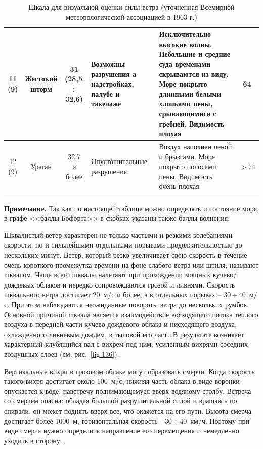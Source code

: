 \documentclass[a4paper, 12pt, twoside, final, book, russian, fittopage, cyremdash]{ncc}
\newcommand{\otdo}{\,\ensuremath{\div}\,}
\newcommand{\ris}[1]{\ref{fig:#1}}
\begin{document}
\begin{longtable}{c|c|c|p{}|p{}|c}
  \midrule
  \shortstack{11\\(9)} &  \shortstack{Жестокий\\шторм} & \shortstack{31\\(28,5\otdo 32,6)} & Возможны разрушения а надстройках, палубе и такелаже & Исключительно высокие волны. Небольшие и средние суда временами скрываются из виду. Море покрыто длинными белыми хлопьями пены, срывающимися с гребней. Видимость плохая & 64 \\
  \midrule
  \shortstack{12\\(9)} & Ураган & \shortstack{32,7\\и более} & Опустошительные разрушения & Воздух наполнен пеной и брызгами. Море покрыто полосами пены. Видимость очень плохая & $>74$ \\
  \bottomrule
  \caption{Шкала для визуальной оценки силы ветра (уточненная Всемирной метеорологической ассоциацией в 1963 г.)}
  \label{tab:6}
\end{longtable}
\normalsize{}

{\small \textbf{Примечание.} Так как по настоящей таблице можно определять и состояние моря, в графе <<баллы Бофорта>> в скобках указаны также баллы волнения.\smallskip}

Шквалистый ветер характерен не только частыми и резкими колебаниями скорости, но и сильнейшими отдельными порывами продолжительностью до нескольких минут. Ветер, который резко увеличивает свою скорость в течение очень короткого промежутка времени на фоне слабого ветра или штиля, называют шквалом. Чаще всего шквалы налетают при прохождении мощных кучево\-/дождевых облаков и нередко сопровождаются грозой и ливнями. Скорость шквального ветра достигает 20~м/с и более, а в отдельных порывах \--- 30\otdo 40~м/с. При этом наблюдаются неожиданные повороты ветра до нескольких румбов. Основной причиной шквала является взаимодействие восходящего потока теплого воздуха в передней части кучево-дождевого облака и нисходящего воздуха, охлажденного ливневым дождем, в тыловой его части.В результате возникает характерный клубящийся вал с вихрем под ним, усиленным вихрями соседних воздушных слоев (см. рис.~\ris{136}).

Вертикальные вихри в грозовом облаке могут образовать смерчи. Когда скорость такого вихря достигает около 100~м/с, нижняя часть облака в виде воронки опускается к воде, навстречу поднимающемуся вверх водяному столбу. Встреча со смерчем опасна: обладая большой разрушительной силой и вращаясь по спирали, он может поднять вверх все, что окажется на его пути. Высота смерча достигает более 1000~м, горизонтальная скорость \-- 30\otdo 40~км/ч. Поэтому при виде смерча нужно определить направление его перемещения и немедленно уходить в сторону.
\end{document}
